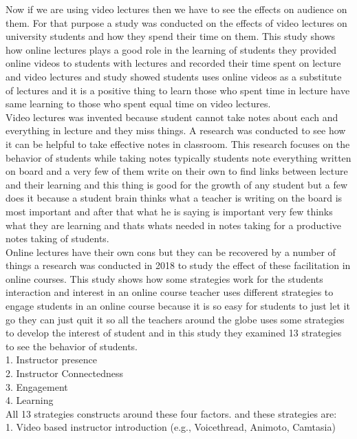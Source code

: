 Now if we are using video lectures then we have to see the effects on audience on them. For that purpose a study was conducted on the effects of video lectures on university students and how they spend their time on them. This study shows how online lectures plays a good role in the learning of students they provided online videos to students with lectures and recorded their time spent on lecture and video lectures and study showed students uses online videos as a substitute of lectures and it is a positive thing to learn those who spent time in lecture have same learning to those who spent equal time on video lectures.\cite{Meehan2019}\\
Video lectures was invented because student cannot take notes about each and everything in lecture and they miss things. A research was conducted to see how it can be helpful to take effective notes in classroom. This research focuses on the behavior of students while taking notes typically students note everything written on board and a very few of them write on their own to find links between lecture and their learning and this thing is good for the growth of any student but a few does it because a student brain thinks what a teacher is writing on the board is most important and after that what he is saying is important very few thinks what they are learning and thats whats needed in notes taking for a productive notes taking of students.\cite{Iannone2019}\\
Online lectures have their own cons but they can be recovered by a number of things a research was conducted in 2018 to study the effect of these facilitation in online courses. This study shows how some strategies work for the students interaction and interest in an online course teacher uses different strategies to engage students in an online course because it is so easy for students to just let it go they can just quit it so all the teachers around the globe uses some strategies to develop the interest of student and in this study they examined 13 strategies to see the behavior of students.\\
1. Instructor presence\\
2. Instructor Connectedness\\
3. Engagement \\
4. Learning\\
All 13 strategies constructs around these four factors. and these strategies are:\\
1. Video based instructor introduction (e.g., Voicethread, Animoto, Camtasia)\\

